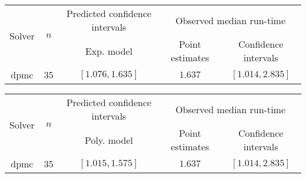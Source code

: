 \begin{tabular}{ccccc}
\hline 
\multirow{2}{*}{Solver} & \multirow{2}{*}{$n$} & Predicted confidence intervals & \multicolumn{2}{c}{Observed median  run-time}\tabularnewline
 &  & Exp. model  & Point estimates  & Confidence intervals\tabularnewline
\hline 
\hline 
\multirow{0}{*}{dpmc} & 35 & $\mathbf{\left[1.076,1.635\right]}$ & $1.637$ & $\left[1.014,2.835\right]$ \tabularnewline 
\hline 
\end{tabular} 

\begin{tabular}{ccccc}
\hline 
\multirow{2}{*}{Solver} & \multirow{2}{*}{$n$} & Predicted confidence intervals & \multicolumn{2}{c}{Observed median  run-time}\tabularnewline
 &  & Poly. model  & Point estimates  & Confidence intervals\tabularnewline
\hline 
\hline 
\multirow{0}{*}{dpmc} & 35 & $\mathbf{\left[1.015,1.575\right]}$ & $1.637$ & $\left[1.014,2.835\right]$ \tabularnewline 
\hline 
\end{tabular} 


